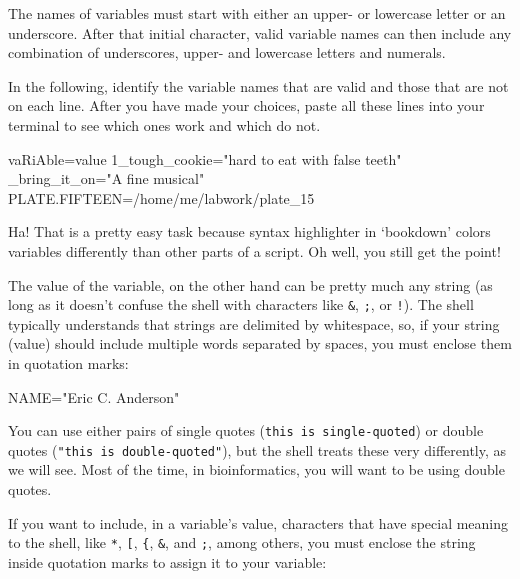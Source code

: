 \documentclass[]{krantz}
\makeatletter
\newenvironment{Shaded}{\begin{snugshade}}{\end{snugshade}}
\newcommand{\ExtensionTok}[1]{#1}
\newcommand{\NormalTok}[1]{#1}
\newcommand{\StringTok}[1]{\textcolor[rgb]{0.5,0.5,0.5}{#1}}
\newcommand{\VariableTok}[1]{\textcolor[rgb]{0,0,0}{#1}}
\newenvironment{kframe}{%
\medskip{}
\setlength{\fboxsep}{.8em}
 \def\at@end@of@kframe{}%
 \ifinner\ifhmode%
  \def\at@end@of@kframe{\end{minipage}}%
  \begin{minipage}{\columnwidth}%
 \fi\fi%
 \def\FrameCommand##1{\hskip\@totalleftmargin \hskip-\fboxsep
 \colorbox{shadecolor}{##1}\hskip-\fboxsep
     \hskip-\linewidth \hskip-\@totalleftmargin \hskip\columnwidth}%
 \MakeFramed {\advance\hsize-\width
   \@totalleftmargin\z@ \linewidth\hsize
   \@setminipage}}%
 {\par\unskip\endMakeFramed%
 \at@end@of@kframe}
\renewenvironment{Shaded}{\begin{kframe}}{\end{kframe}}
\makeatother
\begin{document}
The names of variables must start with either an upper- or lowercase letter
or an underscore. After that initial character, valid variable names can
then include any combination of underscores, upper- and lowercase letters
and numerals.

In the following, identify the variable names that are valid and those
that are not on each line. After you have made your choices, paste all
these lines into your terminal to see which ones work and which do not.

\begin{Shaded}
\begin{Highlighting}[]
\VariableTok{vaRiAble=}\NormalTok{value}
\ExtensionTok{1_tough_cookie}\NormalTok{=}\StringTok{"hard to eat with false teeth"}
\VariableTok{_bring_it_on=}\StringTok{"A fine musical"}
\ExtensionTok{PLATE.FIFTEEN}\NormalTok{=/home/me/labwork/plate_15}
\end{Highlighting}
\end{Shaded}

Ha! That is a pretty easy task because syntax highlighter in `bookdown' colors
variables differently than other parts of a script. Oh well, you still get the point!

The value of the variable, on the other hand can be pretty much any string
(as long as it doesn't confuse the shell with characters like \texttt{\&}, \texttt{;}, or \texttt{!}).
The shell typically understands that strings are delimited by whitespace, so, if
your string (value) should include multiple words separated by spaces, you must
enclose them in quotation marks:

\begin{Shaded}
\begin{Highlighting}[]
\VariableTok{NAME=}\StringTok{"Eric C. Anderson"}
\end{Highlighting}
\end{Shaded}

You can use either pairs of single quotes (\texttt{\textquotesingle{}this\ is\ single-quoted\textquotesingle{}}) or double
quotes (\texttt{"this\ is\ double-quoted"}), but the shell treats these very differently,
as we will see. Most of the time, in bioinformatics, you will want to be using
double quotes.

If you want to include, in a variable's value, characters that have special meaning to the shell,
like \texttt{*}, \texttt{{[}}, \texttt{\{}, \texttt{\&}, and \texttt{;}, among others, you must enclose the string inside quotation
marks to assign it to your variable:
\end{document}

